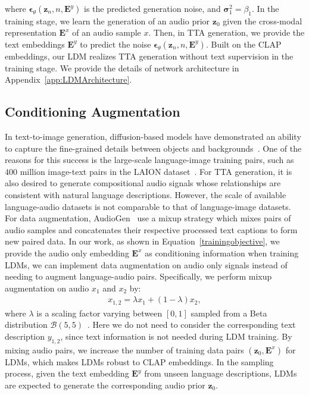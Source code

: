 \documentclass{article}
\begin{document}
where $\boldsymbol{\epsilon}_{\theta}(\boldsymbol{z}_{n},n,\boldsymbol{E}^{y})$ is the predicted generation noise, and $\boldsymbol{\sigma}_{1}^{2}=\beta_{1}$. In the training stage, we learn the generation of an audio prior $\boldsymbol{z}_{0}$ given the cross-modal representation $\boldsymbol{E}^{x}$ of an audio sample $x$. Then, in TTA generation, we provide the text embeddings $\boldsymbol{E}^{y}$ to predict the noise $\boldsymbol{\epsilon}_{\theta}(\boldsymbol{z}_{n},n,\boldsymbol{E}^{y})$. Built on the CLAP embeddings, our LDM realizes TTA generation without text supervision in the training stage. We provide the details of network architecture in Appendix~\ref{app:LDMArchitecture}.

\subsection{Conditioning Augmentation}
\label{CA}

In text-to-image generation, diffusion-based models have demonstrated an ability to capture the fine-grained details between objects and backgrounds~\cite{DALLE2,Imagen,CompositionalDDPM}. One of the reasons for this success is the large-scale language-image training pairs, such as $400$ million image-text pairs in the LAION dataset~\cite{schuhmann2021laion}. For TTA generation, it is also desired to generate compositional audio signals whose relationships are consistent with natural language descriptions. However, the scale of available language-audio datasets is not comparable to that of language-image datasets. For data augmentation, AudioGen~\cite{kreuk2022audiogen} use a mixup strategy which mixes pairs of audio samples and concatenates their respective processed text captions to form new paired data. In our work, as shown in Equation~\ref{trainingobjective}, we provide the audio only embedding $\boldsymbol{E}^{x}$ as conditioning information when training LDMs, we can implement data augmentation on audio only signals instead of needing to augment language-audio pairs. Specifically, we perform mixup augmentation on audio $x_{1}$ and $x_{2}$ by:  
\begin{align}
\label{mixup}
x_{1,2}=\lambda x_{1}+(1-\lambda)x_{2},
\end{align}
where $\lambda$ is a scaling factor varying between $\left[0, 1\right]$ sampled from a Beta distribution $\mathcal B(5,5)$~\cite{gong2021psla}. Here we do not need to consider the corresponding text description $y_{1,2}$, since text information is not needed during LDM training. By mixing audio pairs, we increase the number of training data pairs $(\boldsymbol{z}_{0}, \boldsymbol{E}^{x})$ for LDMs, which makes LDMs robust to CLAP embeddings. In the sampling process, given the text embedding $\boldsymbol{E}^{y}$ from unseen language descriptions, LDMs are expected to generate the corresponding audio prior $\boldsymbol{z}_{0}$.
\end{document}
